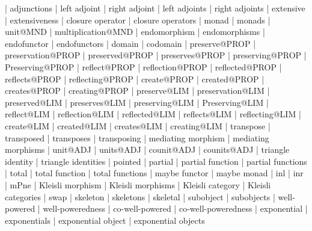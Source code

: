     |   adjunctions
    |   left adjoint
    |   right adjoint
    |   left adjoints
    |   right adjoints
    |   extensive
    |   extensiveness
    |   closure operator
    |   closure operators
    |   monad
    |   monads
    |   unit@MND
    |   multiplication@MND
    |   endomorphism
    |   endomorphisms
    |   endofunctor
    |   endofunctors
    |   domain
    |   codomain
    |   preserve@PROP
    |   preservation@PROP
    |   preserved@PROP
    |   preserves@PROP
    |   preserving@PROP
    |   Preserving@PROP
    |   reflect@PROP
    |   reflection@PROP
    |   reflected@PROP
    |   reflects@PROP
    |   reflecting@PROP
    |   create@PROP
    |   created@PROP
    |   creates@PROP
    |   creating@PROP
    |   preserve@LIM
    |   preservation@LIM
    |   preserved@LIM
    |   preserves@LIM
    |   preserving@LIM
    |   Preserving@LIM
    |   reflect@LIM
    |   reflection@LIM
    |   reflected@LIM
    |   reflects@LIM
    |   reflecting@LIM
    |   create@LIM
    |   created@LIM
    |   creates@LIM
    |   creating@LIM
    |   transpose
    |   transposed
    |   transposes
    |   transposing
    |   mediating morphism
    |   mediating morphisms
    |   unit@ADJ
    |   units@ADJ  
    |   counit@ADJ
    |   counits@ADJ
    |   triangle identity
    |   triangle identities
    |   pointed
    |   partial
    |   partial function
    |   partial functions
    |   total
    |   total function
    |   total functions
    |   maybe functor
    |   maybe monad
    |   inl
    |   inr
    |   mPne
    |   Kleisli morphism
    |   Kleisli morphisms
    |   Kleisli category
    |   Kleisli categories
    |   swap
    |   skeleton
    |   skeletons
    |   skeletal
    |   subobject
    |   subobjects
    |   well-powered
    |   well-poweredness
    |   co-well-powered
    |   co-well-poweredness
    |   exponential
    |   exponentials
    |   exponential object
    |   exponential objects
